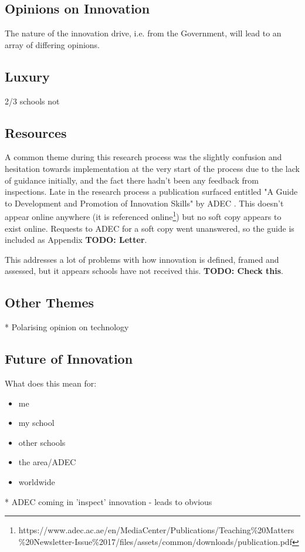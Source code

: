 \subsection{Opinions on Innovation}

The nature of the innovation drive, i.e. from the Government, will lead to an array of differing opinions.

\subsection{Luxury}
2/3 schools not \cite{ADEC2016 pi.3}

\subsection{Resources}
A common theme during this research process was the slightly confusion and hesitation towards implementation at the very start of the process due to the lack of guidance initially, and the fact there hadn't been any feedback from inspections. Late in the research process a publication surfaced entitled "A Guide to Development and Promotion of Innovation Skills" by ADEC \citet{ADEC2015a}. This doesn't appear online anywhere (it is referenced online\footnote{https://www.adec.ac.ae/en/MediaCenter/Publications/Teaching\%20Matters\%20Newsletter-Issue\%2017/files/assets/common/downloads/publication.pdf}) but no soft copy appears to exist online. Requests to ADEC for a soft copy went unanswered, so the guide is included as Appendix \textbf{TODO: Letter}.

This addresses a lot of problems with how innovation is defined, framed and assessed, but it appears schools have not received this. \textbf{TODO: Check this}.

\subsection{Other Themes}
* Polarising opinion on technology

\subsection{Future of Innovation}


What does this mean for:
\begin{itemize}
\item me
\item my school
\item other schools
\item the area/ADEC
\item worldwide
\end{itemize}
* ADEC coming in 'inspect' innovation - leads to obvious
